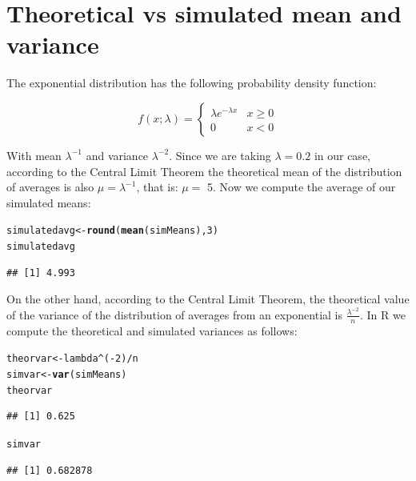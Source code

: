 \documentclass{article}\usepackage[]{graphicx}\usepackage[]{color}
\makeatletter
\newcommand{\hlnum}[1]{\textcolor[rgb]{0.686,0.059,0.569}{#1}}%
\newcommand{\hlopt}[1]{\textcolor[rgb]{0,0,0}{#1}}%
\newcommand{\hlstd}[1]{\textcolor[rgb]{0.345,0.345,0.345}{#1}}%
\newcommand{\hlkwb}[1]{\textcolor[rgb]{0.69,0.353,0.396}{#1}}%
\newcommand{\hlkwd}[1]{\textcolor[rgb]{0.737,0.353,0.396}{\textbf{#1}}}%
\newenvironment{kframe}{%
 \def\at@end@of@kframe{}%
 \ifinner\ifhmode%
  \def\at@end@of@kframe{\end{minipage}}%
  \begin{minipage}{\columnwidth}%
 \fi\fi%
 \def\FrameCommand##1{\hskip\@totalleftmargin \hskip-\fboxsep
 \colorbox{shadecolor}{##1}\hskip-\fboxsep
     \hskip-\linewidth \hskip-\@totalleftmargin \hskip\columnwidth}%
 \MakeFramed {\advance\hsize-\width
   \@totalleftmargin\z@ \linewidth\hsize
   \@setminipage}}%
 {\par\unskip\endMakeFramed%
 \at@end@of@kframe}
\newenvironment{knitrout}{}{} %
\makeatother
\begin{document}
\section{Theoretical vs simulated mean and variance}

The exponential distribution has the following probability density function:
  
\begin{equation*}
f(x;\lambda) =
\begin{cases}
\lambda e^{-\lambda x} & x\geq 0\\
0 &  x<0
\end{cases}
\end{equation*}

With mean $\lambda^{-1}$ and variance $\lambda^{-2}$. Since we are taking $\lambda = 0.2$ in our case, according to the Central Limit Theorem the theoretical mean of the distribution of averages is also  $\mu = \lambda^{-1}$, that is:  $\mu =$ 5. Now we compute the average of our simulated means:

\begin{knitrout}
\color{fgcolor}\begin{kframe}
\begin{alltt}
\hlstd{simulatedavg} \hlkwb{<-} \hlkwd{round}\hlstd{(}\hlkwd{mean}\hlstd{(simMeans),}\hlnum{3}\hlstd{)}
\hlstd{simulatedavg}
\end{alltt}
\begin{verbatim}
## [1] 4.993
\end{verbatim}
\end{kframe}
\end{knitrout}

On the other hand, according to the Central Limit Theorem, the theoretical value of the variance of the distribution of averages from an exponential is $\displaystyle{\frac{\lambda^{-2}}{n}}$. In R we compute the theoretical and simulated variances as follows:

\begin{knitrout}
\color{fgcolor}\begin{kframe}
\begin{alltt}
\hlstd{theorvar}  \hlkwb{<-} \hlstd{lambda}\hlopt{^}\hlstd{(}\hlopt{-}\hlnum{2}\hlstd{)} \hlopt{/} \hlstd{n}
\hlstd{simvar} \hlkwb{<-} \hlkwd{var}\hlstd{(simMeans)}
\hlstd{theorvar}
\end{alltt}
\begin{verbatim}
## [1] 0.625
\end{verbatim}
\begin{alltt}
\hlstd{simvar}
\end{alltt}
\begin{verbatim}
## [1] 0.682878
\end{verbatim}
\end{kframe}
\end{knitrout}
\end{document}
